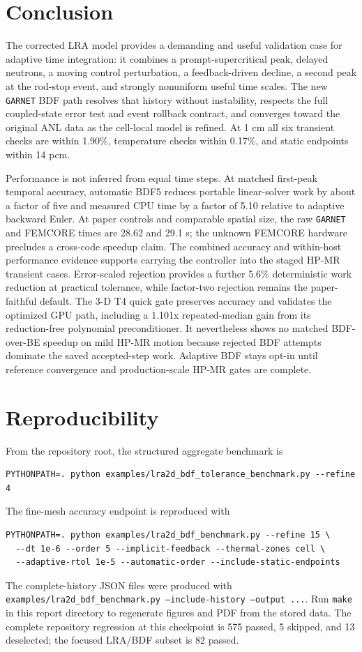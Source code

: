 \documentclass[10pt]{article}
\newcommand{\garnet}{\texttt{GARNET}}
\newcommand{\code}[1]{\texttt{#1}}
\begin{document}
\section{Conclusion}

The corrected LRA model provides a demanding and useful validation case for
adaptive time integration: it combines a prompt-supercritical peak, delayed
neutrons, a moving control perturbation, a feedback-driven decline, a second
peak at the rod-stop event, and strongly nonuniform useful time scales. The new
\garnet{} BDF path resolves that history without instability, respects the full
coupled-state error test and event rollback contract, and converges toward the
original ANL data as the cell-local model is refined. At 1 cm all six transient
checks are within 1.90\%, temperature checks within 0.17\%, and static endpoints
within 14 pcm.

Performance is not inferred from equal time steps. At matched first-peak
temporal accuracy, automatic BDF5 reduces portable linear-solver work by about
a factor of five and measured CPU time by a factor of 5.10 relative to adaptive
backward Euler. At paper controls and comparable spatial size, the raw \garnet{}
and FEMCORE times are 28.62 and 29.1 s; the unknown FEMCORE hardware precludes
a cross-code speedup claim. The combined accuracy and within-host performance
evidence supports carrying the controller into the staged HP-MR transient
cases. Error-scaled rejection provides a further 5.6\% deterministic work
reduction at practical tolerance, while factor-two rejection remains the
paper-faithful default. The 3-D T4 quick gate preserves accuracy and validates
the optimized GPU path, including a 1.101x repeated-median gain from its
reduction-free polynomial preconditioner. It nevertheless shows no matched
BDF-over-BE speedup on mild HP-MR motion because rejected BDF attempts dominate
the saved accepted-step work. Adaptive BDF stays opt-in until reference
convergence and production-scale HP-MR gates are complete.

\section*{Reproducibility}

From the repository root, the structured aggregate benchmark is
\begin{verbatim}
PYTHONPATH=. python examples/lra2d_bdf_tolerance_benchmark.py --refine 4
\end{verbatim}
The fine-mesh accuracy endpoint is reproduced with
\begin{verbatim}
PYTHONPATH=. python examples/lra2d_bdf_benchmark.py --refine 15 \
  --dt 1e-6 --order 5 --implicit-feedback --thermal-zones cell \
  --adaptive-rtol 1e-5 --automatic-order --include-static-endpoints
\end{verbatim}
The complete-history JSON files were produced with
\code{examples/lra2d\_bdf\_benchmark.py --include-history --output ...}.
Run \code{make} in this report directory to regenerate figures and PDF from
the stored data. The complete repository regression at this checkpoint is 575
passed, 5 skipped, and 13 deselected; the focused LRA/BDF subset is 82 passed.
\end{document}
